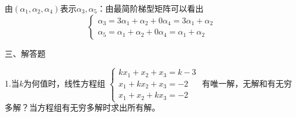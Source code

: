 \documentclass{article}
\begin{document}
\begin{jie}
由$(\alpha_1,\alpha_2,\alpha_4)$表示$\alpha_3,\alpha_5$：由最简阶梯型矩阵可以看出
\begin{equation*}
\begin{cases}
\alpha_3=3\alpha_1+\alpha_2+0\alpha_4=3\alpha_1+\alpha_2\\ \alpha_5=\alpha_1+\alpha_2+0\alpha_4=\alpha_1+\alpha_2
\end{cases}
\end{equation*}

\end{jie}

三、解答题

1.当$k$为何值时，线性方程组
$
\begin{cases}
kx_{1}+x_{2}+x_{3}=k-3\\
x_{1}+kx_{2}+x_{3}=-2\\
x_{1}+x_{2}+kx_{3}=-2
\end{cases}
$
有唯一解，无解和有无穷多解？当方程组有无穷多解时求出所有解。
\end{document}
